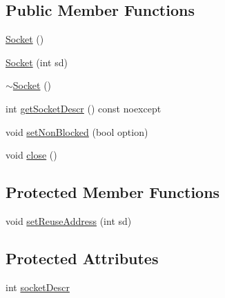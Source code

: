 \subsection*{Public Member Functions}
\begin{DoxyCompactItemize}
\item 
\hyperlink{class_socket_a7c3256c4fc6e2c603df73201049fae5a}{Socket} ()
\item 
\hyperlink{class_socket_aaba0adce0be29d723470f6e80d65b67e}{Socket} (int sd)
\item 
\hyperlink{class_socket_aeac4eb6379a543d38ed88977d3b6630a}{$\sim$\-Socket} ()
\item 
int \hyperlink{class_socket_ae10384da04283e2a75b4cfbb8c6da59a}{get\-Socket\-Descr} () const noexcept
\item 
void \hyperlink{class_socket_aa264f52f830e5c1bea3cd92732df35f8}{set\-Non\-Blocked} (bool option)
\item 
void \hyperlink{class_socket_a75ee749264ccbcfc4dfbf5442e55dcb8}{close} ()
\end{DoxyCompactItemize}
\subsection*{Protected Member Functions}
\begin{DoxyCompactItemize}
\item 
void \hyperlink{class_socket_a51eb429ad7f6f6ab1adafe64d302ed55}{set\-Reuse\-Address} (int sd)
\end{DoxyCompactItemize}
\subsection*{Protected Attributes}
\begin{DoxyCompactItemize}
\item 
int \hyperlink{class_socket_a610fbf456550dd084cfaee9d1267e5c8}{socket\-Descr}
\end{DoxyCompactItemize}



